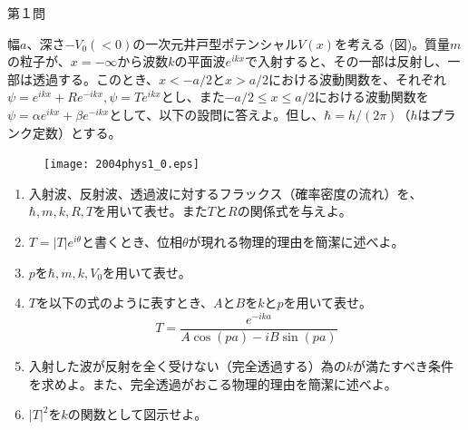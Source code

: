 \documentclass[fleqn]{jbook}
\numberwithin{equation}{section}
\numberwithin{figure}{section}
\numberwithin{table}{section}
\begin{document}
\begin{question}{第１問}{}

幅$a$、深さ$-V_0 (<0)$の一次元井戸型ポテンシャル$V(x)$を考える (図)。質量$m$の粒子が、$x=-\infty$から波数$k$の平面波$e^{ikx}$で入射すると、その一部は反射し、一部は透過する。このとき、$x<-a/2$と$x>a/2$における波動関数を、それぞれ$\psi=e^{ikx}+Re^{-ikx}, \psi=Te^{ikx}$とし、また$-a/2\le x\le a/2$における波動関数を$\psi=\alpha e^{ikx}+\beta e^{-ikx}$として、以下の設問に答えよ。但し、$\hbar=h/(2\pi)$（$h$はプランク定数）とする。

\begin{figure}[htbp]
\begin{center}
\texttt{[image: 2004phys1\_0.eps]}
\caption{}
\end{center}
\end{figure}

\begin{enumerate}
\item 入射波、反射波、透過波に対するフラックス（確率密度の流れ）を、$\hbar, m, k, R,T$を用いて表せ。また$T$と$R$の関係式を与えよ。
\item $T=|T|e^{i\theta}$と書くとき、位相$\theta$が現れる物理的理由を簡潔に述べよ。
\item $p$を$\hbar,m,k,V_0$を用いて表せ。
\item $T$を以下の式のように表すとき、$A$と$B$を$k$と$p$を用いて表せ。
$$
T=\frac{e^{-ika}}{A\cos(pa)-iB\sin(pa)}
$$

\item 入射した波が反射を全く受けない（完全透過する）為の$k$が満たすべき条件を求めよ。また、完全透過がおこる物理的理由を簡潔に述べよ。

\item $|T|^2$を$k$の関数として図示せよ。
\end{enumerate}
\end{question}
\end{document}
